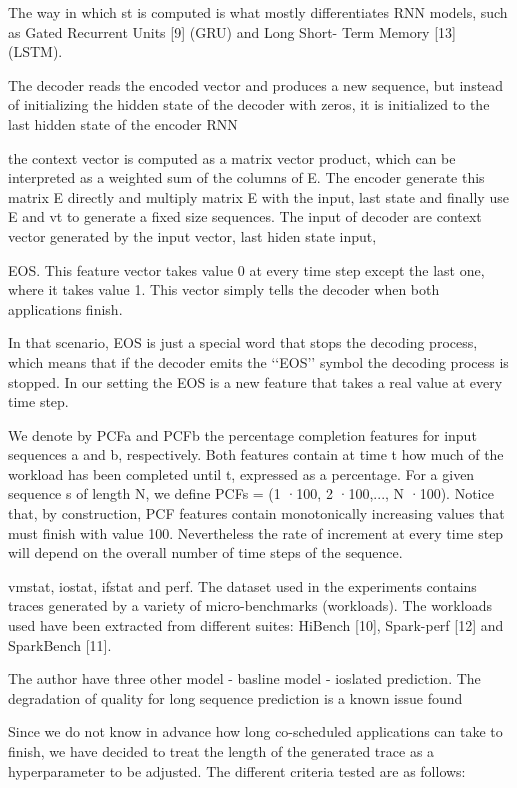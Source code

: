 \documentclass[UTF8]{article}
\begin{document}
The way in which st is computed is what mostly differentiates RNN models, such as Gated Recurrent Units [9] (GRU) and Long Short- Term Memory [13] (LSTM).

The decoder reads the encoded vector and produces a new sequence, but instead of initializing the hidden state of the decoder with zeros, it is initialized to the last hidden state of the encoder RNN

the context vector is computed as a matrix vector product, which can be interpreted as a weighted sum of the columns of E. The encoder generate this matrix E directly and multiply matrix E with the input, last state and finally use E and vt to generate a fixed size sequences. The input of decoder are context vector generated by the input vector, last hiden state input, 

EOS. This feature vector takes value 0 at every time step except the last one, where it takes value 1. This vector simply tells the decoder when both applications finish.

In that scenario, EOS is just a special word that stops the decoding process, which means that if the decoder emits the ‘‘EOS’’ symbol the decoding process is stopped. In our setting the EOS is a new feature that takes a real value at every time step.

We denote by PCFa and PCFb the percentage completion features for input sequences a and b, respectively. Both features contain at time t how much of the workload has been completed until t, expressed as a percentage. For a given sequence s of length N, we define PCFs = (1 ·100, 2 ·100,..., N ·100). Notice that, by construction, PCF features contain monotonically increasing values that must finish with value 100. Nevertheless the rate of increment at every time step will depend on the overall number of time steps of the sequence.

vmstat, iostat, ifstat and perf. The dataset used in the experiments contains traces generated by a variety of micro-benchmarks (workloads). The workloads used have been extracted from different suites: HiBench [10], Spark-perf [12] and SparkBench [11]. 

The author have three other model - basline model - ioslated prediction. The degradation of quality for long sequence prediction is a known issue found

Since we do not know in advance how long co-scheduled applications can take to finish, we have decided to treat the length of the generated trace as a hyperparameter to be adjusted. The different criteria tested are as follows:
\end{document}
